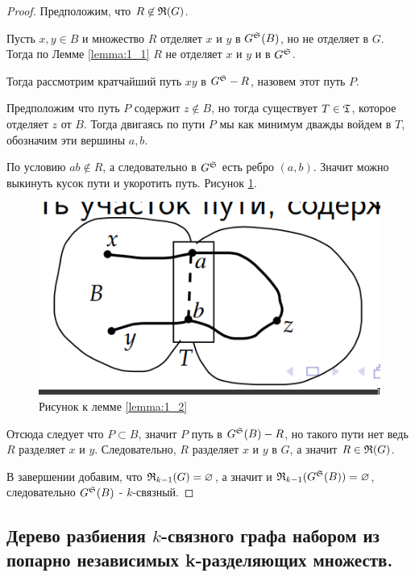 \documentclass[../main.tex]{subfiles}
\begin{document}
\begin{proof}

	Предположим, что $R \not \in \R(G)$.

	Пусть $x, y \in B$ и множество  $R$ отделяет $x$ и $y$ в $G^\S(B)$, но не отделяет в $G$.
	Тогда по Лемме \ref{lemma:1_1} $R$ не отделяет $x$ и $y$ и в $G^\S$.

	Тогда рассмотрим кратчайший путь  $xy$ в $G^\S - R$, назовем этот путь $P$.

	Предположим что путь $P$ содержит $z \not \in B$, но тогда существует $T \in \T$, которое отделяет $z$ от $B$.
	Тогда двигаясь по пути $P$ мы как минимум дважды войдем в $T$, обозначим эти вершины $a, b$.

	По условию $ab \not \in R$, а следовательно в $G^\S$ есть ребро $(a,b)$.
	Значит можно выкинуть кусок пути и укоротить путь.
	Рисунок \ref{fig:lemma_1_2}.

\begin{figure}[ht]
    \centering
	\includegraphics[width=0.3\columnwidth]{figures/lemma_1_2.png}
    \caption{Рисунок к лемме \ref{lemma:1_2}}
    \label{fig:lemma_1_2}
\end{figure}

	Отсюда следует что $P \subset B$, значит $P$ путь в  $G^\S(B) - R$, но такого пути нет ведь $R$ разделяет $x$ и $y$.
	Следовательно, $R$ разделяет  $x$ и  $y$ в $G$, а значит $R \in \R(G)$.

	В завершении добавим, что $\R_{k-1}(G) = \varnothing$, а значит и  $\R_{k - 1}(G^\S(B)) = \varnothing$, следовательно $G^\S(B)$ - $k$-связный.
	
\end{proof}

\subsection{Дерево разбиения $k$-связного графа набором из попарно независимых k-разделяющих множеств.}
\end{document}
